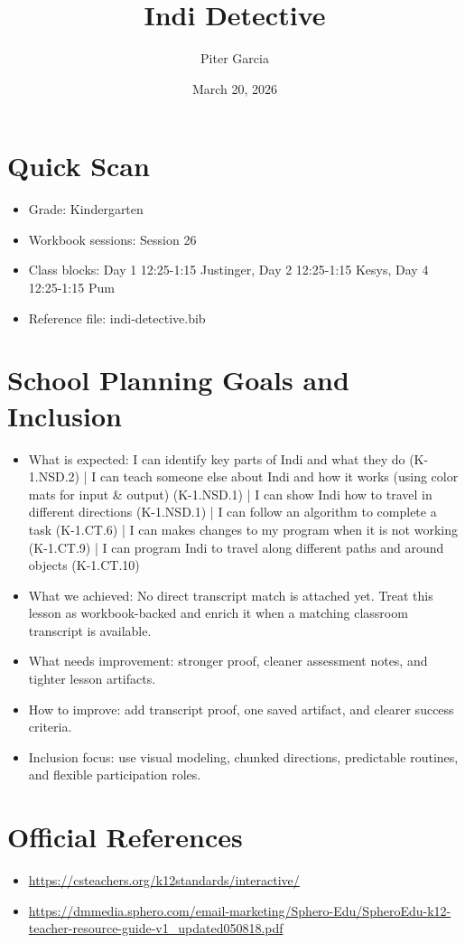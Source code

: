 \documentclass[11pt]{article}
\title{Indi Detective}
\author{Piter Garcia}
\date{March 20, 2026}
\begin{document}
    \maketitle
    \section*{Quick Scan}
    \begin{itemize}[leftmargin=*]
    \item Grade: Kindergarten
    \item Workbook sessions: Session 26
    \item Class blocks: Day 1 12:25-1:15 Justinger, Day 2 12:25-1:15 Kesys, Day 4 12:25-1:15 Pum
    \item Reference file: indi-detective.bib
    \end{itemize}
    \section*{School Planning Goals and Inclusion}
    \begin{itemize}[leftmargin=*]
    \item What is expected: I can identify key parts of Indi and what they do (K-1.NSD.2) | I can teach someone else about Indi and how it works (using color mats for input & output) (K-1.NSD.1) | I can show Indi how to travel in different directions (K-1.NSD.1) | I can follow an algorithm to complete a task (K-1.CT.6) | I can makes changes to my program when it is not working (K-1.CT.9) | I can program Indi to travel along different paths and around objects (K-1.CT.10)
    \item What we achieved: No direct transcript match is attached yet. Treat this lesson as workbook-backed and enrich it when a matching classroom transcript is available.
    \item What needs improvement: stronger proof, cleaner assessment notes, and tighter lesson artifacts.
    \item How to improve: add transcript proof, one saved artifact, and clearer success criteria.
    \item Inclusion focus: use visual modeling, chunked directions, predictable routines, and flexible participation roles.
    \end{itemize}
    \section*{Official References}
    \begin{itemize}[leftmargin=*]
    \item \url{https://csteachers.org/k12standards/interactive/}
\item \url{https://dmmedia.sphero.com/email-marketing/Sphero-Edu/SpheroEdu-k12-teacher-resource-guide-v1_updated050818.pdf}

    \end{itemize}
    
\end{document}
